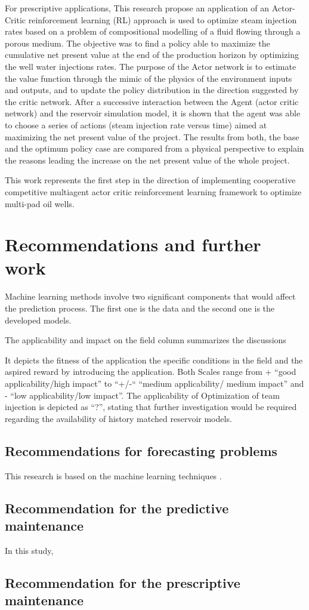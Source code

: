 For prescriptive applications, This research propose an application of an Actor-Critic reinforcement learning (RL) approach is used to optimize steam injection rates based on a problem of compositional modelling of a fluid flowing through a porous medium. The objective was to find a policy able to maximize the cumulative net present value at the end of the production horizon by optimizing the well water injections rates. The purpose of the Actor network is to estimate the value function through the mimic of the physics of the environment inputs and outputs, and to update the policy distribution in the direction suggested by the critic network. After a successive interaction between the Agent (actor critic network) and the reservoir simulation model, it is shown that the agent was able to choose a series of actions (steam injection rate versus time) aimed at maximizing the net present value of the project. The results from both, the base and the optimum policy case are compared from a physical perspective to explain the reasons leading the increase on the net present value of the whole project. 

This work represents the first step in the direction of implementing cooperative competitive multiagent actor critic reinforcement learning framework to optimize multi-pad oil wells.

\section{Recommendations and further work}

Machine learning methods involve two significant components that would affect the prediction process. The first one is the data and the second one is the developed models.


The applicability and impact on the field column summarizes the discussions 

It depicts the fitness of the application the specific conditions in the field and the aspired reward by introducing the application. Both Scales range from + “good applicability/high impact” to “+/-“ “medium applicability/ medium impact” and - “low applicability/low impact”. The applicability of Optimization of team injection is depicted as “?”, stating that further investigation would be required regarding the availability of history matched reservoir models. 


\subsection{Recommendations for forecasting problems}
This research is based on the machine learning techniques
. 
\subsection{Recommendation for the predictive maintenance}  
In this study, 

\subsection{Recommendation for the prescriptive maintenance}
